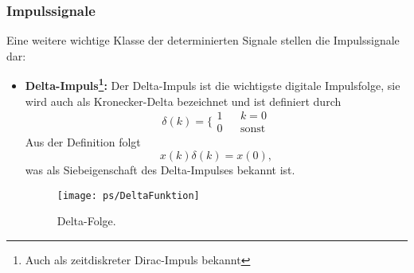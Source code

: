 \subsubsection{Impulssignale}
Eine weitere wichtige Klasse der determinierten Signale stellen die Impulssignale dar:
\begin{itemize}
    \item{{\bf Delta-Impuls\footnote{Auch als zeitdiskreter Dirac-Impuls bekannt}:}
    Der Delta-Impuls ist die wichtigste digitale Impulsfolge, sie wird auch
    als Kronecker-Delta bezeichnet und ist definiert durch
    \begin{equation}
    \delta(k) = \bigg\{ \begin{array}{lcc}
       1 & & k = 0\\
        0  & & \mbox{sonst}
    \end{array}
    \end{equation}
    Aus der Definition folgt
    \begin{equation}
        x(k) \delta(k) = x(0),
    \end{equation}
    was als Siebeigenschaft des Delta-Impulses bekannt ist.
\begin{figure}[h]
\begin{center}
\texttt{[image: ps/DeltaFunktion]}
\caption{\label{pic:DeltaFunktion} Delta-Folge.}
\end{center}
\end{figure}

}
\end{itemize}
